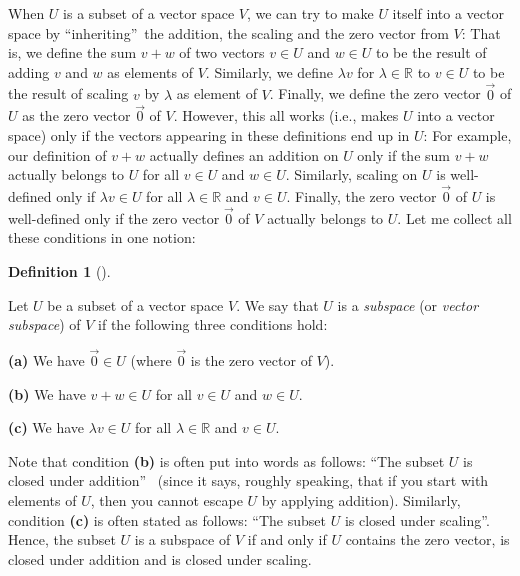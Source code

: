 \documentclass[numbers=enddot,12pt,final,onecolumn,notitlepage]{scrartcl}%
\theoremstyle{definition}
\newtheorem{defi}[theo]{Definition}
\newenvironment{definition}[1][]
{\begin{defi}[#1]\begin{leftbar}}
{\end{leftbar}\end{defi}}
\begin{document}
When $U$ is a subset of a vector space $V$, we can try to make $U$ itself into
a vector space by \textquotedblleft inheriting\textquotedblright\ the
addition, the scaling and the zero vector from $V$: That is, we define the sum
$v+w$ of two vectors $v\in U$ and $w\in U$ to be the result of adding $v$ and
$w$ as elements of $V$. Similarly, we define $\lambda v$ for $\lambda
\in\mathbb{R}$ to $v\in U$ to be the result of scaling $v$ by $\lambda$ as
element of $V$. Finally, we define the zero vector $\overrightarrow{0}$ of $U$
as the zero vector $\overrightarrow{0}$ of $V$. However, this all works (i.e.,
makes $U$ into a vector space) only if the vectors appearing in these
definitions end up in $U$: For example, our definition of $v+w$ actually
defines an addition on $U$ only if the sum $v+w$ actually belongs to $U$ for
all $v\in U$ and $w\in U$. Similarly, scaling on $U$ is well-defined only if
$\lambda v\in U$ for all $\lambda\in\mathbb{R}$ and $v\in U$. Finally, the
zero vector $\overrightarrow{0}$ of $U$ is well-defined only if the zero
vector $\overrightarrow{0}$ of $V$ actually belongs to $U$. Let me collect all
these conditions in one notion:

\begin{definition}
\label{def.subspace}Let $U$ be a subset of a vector space $V$. We say that $U$
is a \textit{subspace} (or \textit{vector subspace}) of $V$ if the following
three conditions hold:

\textbf{(a)} We have $\overrightarrow{0}\in U$ (where $\overrightarrow{0}$ is
the zero vector of $V$).

\textbf{(b)} We have $v+w\in U$ for all $v\in U$ and $w\in U$.

\textbf{(c)} We have $\lambda v\in U$ for all $\lambda\in\mathbb{R}$ and $v\in
U$.

Note that condition \textbf{(b)} is often put into words as follows:
\textquotedblleft The subset $U$ is closed under addition\textquotedblright%
\ (since it says, roughly speaking, that if you start with elements of $U$,
then you cannot escape $U$ by applying addition). Similarly, condition
\textbf{(c)} is often stated as follows: \textquotedblleft The subset $U$ is
closed under scaling\textquotedblright. Hence, the subset $U$ is a subspace of
$V$ if and only if $U$ contains the zero vector, is closed under addition and
is closed under scaling.
\end{definition}
\end{document}
